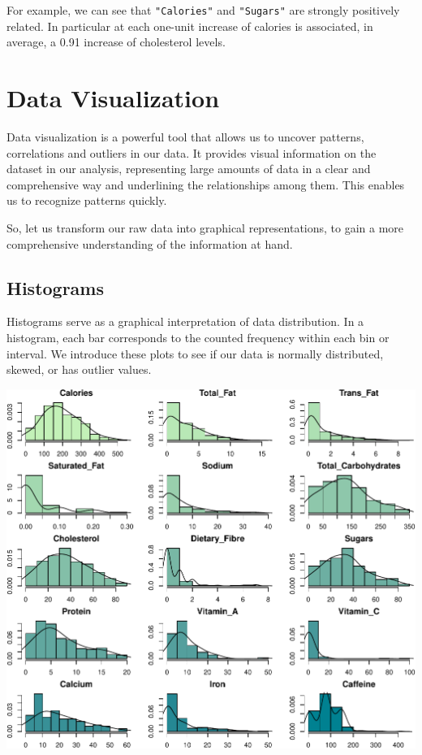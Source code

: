 \documentclass[
]{article}
\begin{document}
For example, we can see that \texttt{"Calories"} and \texttt{"Sugars"}
are strongly positively related. In particular at each one-unit increase
of calories is associated, in average, a 0.91 increase of cholesterol
levels.

\section{Data Visualization}\label{data-visualization}

Data visualization is a powerful tool that allows us to uncover
patterns, correlations and outliers in our data. It provides visual
information on the dataset in our analysis, representing large amounts
of data in a clear and comprehensive way and underlining the
relationships among them. This enables us to recognize patterns quickly.

So, let us transform our raw data into graphical representations, to
gain a more comprehensive understanding of the information at hand.

\subsection{Histograms}\label{histograms}

Histograms serve as a graphical interpretation of data distribution. In
a histogram, each bar corresponds to the counted frequency within each
bin or interval. We introduce these plots to see if our data is normally
distributed, skewed, or has outlier values.

\begin{center}\includegraphics{Statistical_Learning_Final_Report_files/figure-latex/histograms-1} \end{center}
\end{document}
